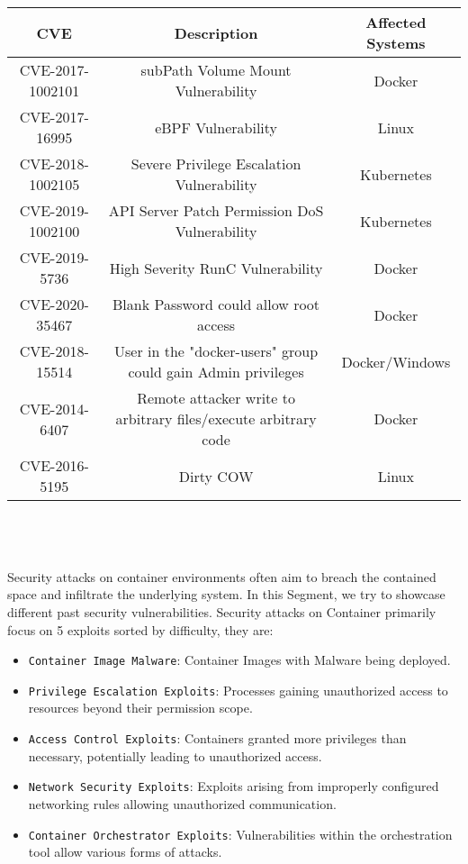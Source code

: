 \documentclass{article}
\begin{document}
\begin{tabular}{|c|c|c|}
\hline
CVE & Description & Affected Systems \\
\hline
CVE-2017-1002101 & subPath Volume Mount Vulnerability & Docker \\
CVE-2017-16995 & eBPF Vulnerability & Linux \\
CVE-2018-1002105 & Severe Privilege Escalation Vulnerability & Kubernetes \\
CVE-2019-1002100 & API Server Patch Permission DoS Vulnerability & Kubernetes \\
CVE-2019-5736 & High Severity RunC Vulnerability & Docker \\
CVE-2020-35467 & Blank Password could allow root access & Docker \\
CVE-2018-15514 & User in the "docker-users" group could gain Admin privileges & Docker/Windows \\
CVE-2014-6407 & Remote attacker write to arbitrary files/execute arbitrary code & Docker \\
CVE-2016-5195 & Dirty COW & Linux \\
\hline
\end{tabular}
\\ \\ \\
Security attacks on container environments often aim to breach the contained space and infiltrate 
the underlying system. In this Segment, we try to showcase different past security vulnerabilities. 
Security attacks on Container primarily focus on 5 exploits sorted by difficulty, they are:
\begin{itemize}[itemsep=0pt]
    \item \texttt{Container Image Malware}: Container Images with Malware being deployed.
    \item \texttt{Privilege Escalation Exploits}: Processes gaining unauthorized access to 
        resources beyond their permission scope.
    \item \texttt{Access Control Exploits}: Containers granted more privileges than necessary, 
        potentially leading to unauthorized access.
    \item \texttt{Network Security Exploits}: Exploits arising from improperly configured 
        networking rules allowing unauthorized communication.
    \item \texttt{Container Orchestrator Exploits}: Vulnerabilities within the orchestration tool 
        allow various forms of attacks.
\end{itemize}
\end{document}
